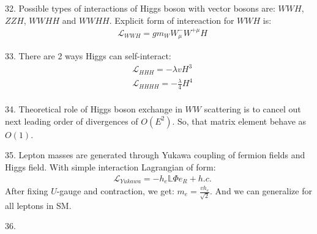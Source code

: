 32. Possible types of interactions of Higgs boson with vector bosons are: $WWH$, $ZZH$, $WWHH$ and $WWHH$. Explicit form of intereaction for $WWH$ is:
\begin{equation}
\begin{split}
&\mathcal{L}_{WWH}=g m_W W^-_\mu W^{+\mu}H
\end{split}
\end{equation}

33. There are 2 ways Higgs can self-interact:
\begin{equation}
\begin{split}
&\mathcal{L}_{HHH} = -\lambda v H^3\\
&\mathcal{L}_{HHHH} = -\frac{\lambda}{4}  H^4 \\
\end{split}
\end{equation}

34. Theoretical role of Higgs boson exchange in $WW$ scattering is to cancel out next leading order of divergences of $O(E^2)$. So, that matrix element behave as $O(1)$.

35. Lepton masses are generated through Yukawa coupling of fermion fields and Higgs field. With simple interaction Lagrangian of form: 
\begin{equation}
\begin{split}
&\mathcal{L}_{Yukawa} = - h_e \mathbb{L} \Phi e_R +h.c.
\end{split}
\end{equation}
After fixing $U$-gauge and contraction, we get: $m_e = \frac{v h_e}{\sqrt{2}}$. And we can generalize for all leptons in SM. 

36. 
\begin{equation}
\begin{split}
&
\end{split}
\end{equation}


